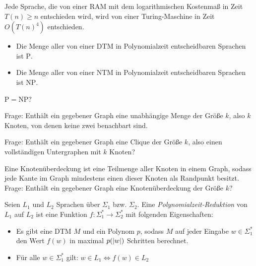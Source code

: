 \documentclass{cheat-sheet}
\begin{document}
\begin{satz}
  Jede Sprache, die von einer RAM mit dem logarithmischen Kostenmaß in Zeit $T(n) \geq n$ entschieden wird, wird von einer Turing-Maschine in Zeit $O(T(n)^4)$ entschieden.
\end{satz}


\begin{nota}
  \begin{itemize}
    \item Die Menge aller von einer DTM in Polynomialzeit entscheidbaren Sprachen ist $\mathrm{P}$.
    \item Die Menge aller von einer NTM in Polynomialzeit entscheidbaren Sprachen ist $\mathrm{NP}$.
  \end{itemize}
\end{nota}

\begin{frage}
  $\mathrm{P} = \mathrm{NP}$?
\end{frage}

\begin{prob}
  Frage: Enthält ein gegebener Graph eine unabhängige Menge der Größe $k$, also $k$ Knoten, von denen keine zwei benachbart sind.
\end{prob}


\begin{prob}[Clique]
  Frage: Enthält ein gegebener Graph eine Clique der Größe $k$, also einen vollständigen Untergraphen mit $k$ Knoten?
\end{prob}

\begin{prob}
  Eine Knotenüberdeckung ist eine Teilmenge aller Knoten in einem Graph, sodass jede Kante im Graph mindestens einen dieser Knoten als Randpunkt besitzt. Frage: Enthält ein gegebener Graph eine Knotenüberdeckung der Größe $k$?
\end{prob}

\begin{defn}
  Seien $L_1$ und $L_2$ Sprachen über $\Sigma_1$ bzw. $\Sigma_2$. Eine \emph{Polynomialzeit-Reduktion} von $L_1$ auf $L_2$ ist eine Funktion $f : \Sigma_1^* \to \Sigma_2^*$ mit folgenden Eigenschaften:
  \begin{itemize}
    \item Es gibt eine DTM $M$ und ein Polynom $p$, sodass $M$ auf jeder Eingabe $w \in \Sigma_1^*$ den Wert $f(w)$ in maximal $p(\lvert w\rvert)$ Schritten berechnet.
    \item Für alle $w \in \Sigma_1^*$ gilt: $w \in L_1 \iff f(w) \in L_2$
  \end{itemize}
\end{defn}
\end{document}
